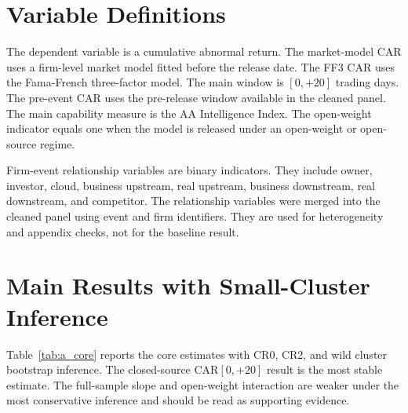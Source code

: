 \documentclass[12pt]{article}
\begin{document}
\section{Variable Definitions}
\label{app:variables}

The dependent variable is a cumulative abnormal return. The market-model CAR uses
a firm-level market model fitted before the release date. The FF3 CAR uses the
Fama-French three-factor model. The main window is $[0,{+}20]$ trading days. The
pre-event CAR uses the pre-release window available in the cleaned panel. The main
capability measure is the AA Intelligence Index. The open-weight indicator equals
one when the model is released under an open-weight or open-source regime.

Firm-event relationship variables are binary indicators. They include owner,
investor, cloud, business upstream, real upstream, business downstream, real
downstream, and competitor. The relationship variables were merged into the
cleaned panel using event and firm identifiers. They are used for heterogeneity
and appendix checks, not for the baseline result.

\section{Main Results with Small-Cluster Inference}
\label{app:smallcluster}

Table~\ref{tab:a_core} reports the core estimates with CR0, CR2, and wild cluster
bootstrap inference. The closed-source CAR$[0,{+}20]$ result is the most stable
estimate. The full-sample slope and open-weight interaction are weaker under the
most conservative inference and should be read as supporting evidence.
\end{document}
